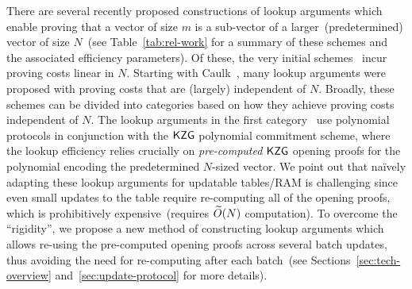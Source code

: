  There are several recently proposed constructions of lookup arguments which enable proving
that a vector of size $m$ is a sub-vector of a larger~(predetermined) vector of size $N$~(see Table~\ref{tab:rel-work}
for a summary of these schemes and the associated efficiency parameters).
Of these, the very initial schemes~\cite{EPRINT:BowGriHop19,EPRINT:GabWil20,Halo2} incur proving costs
linear in $N$. Starting with Caulk~\cite{CCS:ZBKMNS22}, many lookup arguments were proposed with
proving costs that are (largely) independent of $N$. Broadly, these schemes can be divided into categories
based on how they achieve proving costs independent of $N$. The lookup arguments in the first
category~\cite{CCS:ZBKMNS22,EPRINT:PosKat22,EPRINT:GabKho22,EPRINT:EagFioGab22,EPRINT:ZGKMR22,PKC:CFFLL24,PKC:ZSG24} use polynomial protocols
in conjunction with the $\mathsf{KZG}$ polynomial commitment scheme, where the lookup efficiency relies crucially on \textit{pre-computed}
$\mathsf{KZG}$ opening proofs for the polynomial encoding the predetermined $N$-sized vector.
We point out that na\"ively adapting these lookup arguments for updatable tables/RAM is challenging since
even small updates to the table require re-computing all of the opening proofs,
which is prohibitively expensive~(requires $\widetilde{O}(N)$ computation).
To overcome the ``rigidity'', we propose a new method of constructing lookup arguments which allows
re-using the pre-computed opening proofs across several batch updates, thus avoiding the need for
re-computing after each batch~(see Sections~\ref{sec:tech-overview} and~\ref{sec:update-protocol} for more details).


